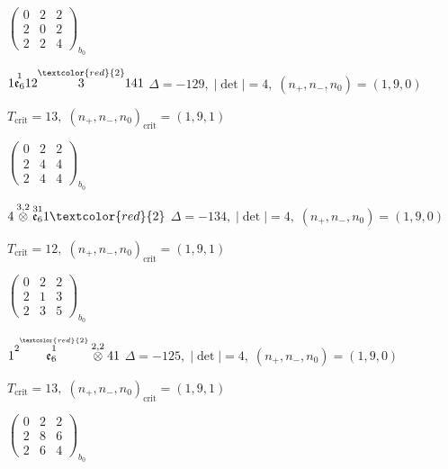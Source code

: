 \documentclass[10pt]{article}
\begin{document}
\hspace{2em}$\left(\begin{smallmatrix}0 & 2 & 2 \\ 2 & 0 & 2 \\ 2 & 2 & 4\end{smallmatrix}\right)_{\!b_0}$

\smallskip

$1\overset{1}{\mathfrak{e}_6}12\overset{\textcolor{red}{2}}{3}141$ \quad $\Delta=-129,\; |\det|=4,\; (n_+,n_-,n_0)=(1,9,0)$

\hspace{1em}$T_{\text{crit}}=13,\; (n_+,n_-,n_0)_{\text{crit}}=(1,9,1)$

\hspace{2em}$\left(\begin{smallmatrix}0 & 2 & 2 \\ 2 & 4 & 4 \\ 2 & 4 & 4\end{smallmatrix}\right)_{\!b_0}$

\smallskip

$4\overset{3,2}{\otimes}\overset{31}{\mathfrak{e}_6}1\textcolor{red}{2}$ \quad $\Delta=-134,\; |\det|=4,\; (n_+,n_-,n_0)=(1,9,0)$

\hspace{1em}$T_{\text{crit}}=12,\; (n_+,n_-,n_0)_{\text{crit}}=(1,9,1)$

\hspace{2em}$\left(\begin{smallmatrix}0 & 2 & 2 \\ 2 & 1 & 3 \\ 2 & 3 & 5\end{smallmatrix}\right)_{\!b_0}$

\smallskip

$1\overset{2\overset{\textcolor{red}{2}}{1}}{\mathfrak{e}_6}\overset{2,2}{\otimes}41$ \quad $\Delta=-125,\; |\det|=4,\; (n_+,n_-,n_0)=(1,9,0)$

\hspace{1em}$T_{\text{crit}}=13,\; (n_+,n_-,n_0)_{\text{crit}}=(1,9,1)$

\hspace{2em}$\left(\begin{smallmatrix}0 & 2 & 2 \\ 2 & 8 & 6 \\ 2 & 6 & 4\end{smallmatrix}\right)_{\!b_0}$
\end{document}
